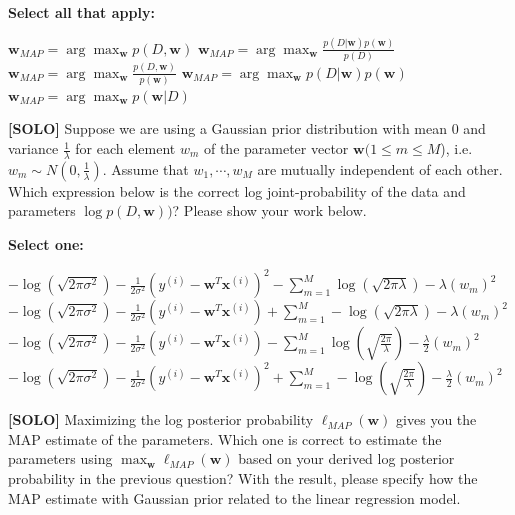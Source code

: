 \documentclass[11pt,addpoints,answers]{exam}
\newcommand{\solo}{\textbf{[SOLO]} }
\begin{document}
\begin{questions}
    
    \textbf{Select all that apply:}
    {\checkboxchar{$\Box$} \checkedchar{$\blacksquare$}
    \begin{checkboxes}
        \CorrectChoice $\mathbf{w}_{MAP} = \arg\max_{\mathbf{w}} p(D, \mathbf{w})$
        \CorrectChoice $\mathbf{w}_{MAP} = \arg\max_{\mathbf{w}} \frac{p(D| \mathbf{w})p(\mathbf{w})}{p(D)}$
        \choice $\mathbf{w}_{MAP} = \arg\max_{\mathbf{w}} \frac{p(D, \mathbf{w})}{p(\mathbf{w})}$
        \CorrectChoice $\mathbf{w}_{MAP} = \arg\max_{\mathbf{w}} p(D| \mathbf{w})p(\mathbf{w})$
        \CorrectChoice $\mathbf{w}_{MAP} = \arg\max_{\mathbf{w}} p(\mathbf{w}| D)$
    \end{checkboxes}
    }
    
    
    \question[3]\solo Suppose we are using a Gaussian prior distribution with mean 0 and variance $\frac{1}{\lambda}$ for each element $w_m$  of the parameter vector $\mathbf{w} (1 \leq m \leq M $), i.e. $w_m \sim N(0, \frac{1}{\lambda})$. Assume that $w_1, \cdots, w_M$ are mutually independent of each other. Which expression below is the correct log joint-probability of the data and parameters $\log p(D, \mathbf{w}))$?  Please show your work below.


    \textbf{Select one:}
    \begin{checkboxes}
        \choice $-\log (\sqrt{2\pi\sigma^2}) - \frac{1}{2\sigma^2} (y^{(i)} - \mathbf{w}^T\mathbf{x}^{(i)})^2 - \sum_{m=1}^M \log(\sqrt{2\pi\lambda}) - \lambda (w_m)^2$
        \choice $-\log (\sqrt{2\pi\sigma^2}) - \frac{1}{2\sigma^2} (y^{(i)} - \mathbf{w}^T\mathbf{x}^{(i)}) + \sum_{m=1}^M -\log(\sqrt{2\pi\lambda}) - \lambda (w_m)^2$
        \choice $-\log (\sqrt{2\pi\sigma^2}) - \frac{1}{2\sigma^2} (y^{(i)} - \mathbf{w}^T\mathbf{x}^{(i)}) -  \sum_{m=1}^M \log(\sqrt{\frac{2\pi}{\lambda}}) - \frac{\lambda}{2}(w_m)^2$
        \CorrectChoice $-\log (\sqrt{2\pi\sigma^2}) - \frac{1}{2\sigma^2} (y^{(i)} - \mathbf{w}^T\mathbf{x}^{(i)})^2 +  \sum_{m=1}^M -\log(\sqrt{\frac{2\pi}{\lambda}}) - \frac{\lambda}{2}(w_m)^2$
    \end{checkboxes}
    
    
        
    
    \question[3]\solo Maximizing the log posterior probability  $\ell_{\textit{MAP}}(\mathbf{w})$ gives you the MAP estimate of the parameters. Which one is correct to estimate the parameters using $\max_{\mathbf{w}} \ell_{\textit{MAP}}(\mathbf{w})$ based on your derived log posterior probability in the previous question?  With the result, please specify how the MAP estimate with Gaussian prior related to the linear regression model.
    


\end{questions}
\end{document}
